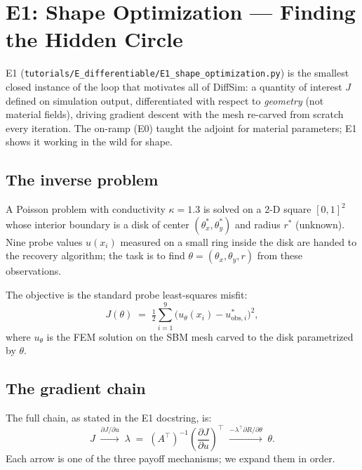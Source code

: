 \documentclass[11pt]{article}
\begin{document}
\section{E1: Shape Optimization --- Finding the Hidden Circle}
\label{sec:e1}

E1 (\texttt{tutorials/E\_differentiable/\allowbreak E1\_shape\_optimization.py})
is the smallest closed instance of the loop that motivates all of DiffSim:
a quantity of interest $J$ defined on simulation output, differentiated with
respect to \emph{geometry} (not material fields), driving gradient descent
with the mesh re-carved from scratch every iteration.  The on-ramp (E0)
taught the adjoint for material parameters; E1 shows it working in the wild
for shape.

\subsection{The inverse problem}
\label{sec:e1problem}

A Poisson problem with conductivity $\kappa = 1.3$ is solved on a 2-D
square $[0,1]^2$ whose interior boundary is a disk of center
$(\theta_x^*, \theta_y^*)$ and radius $r^*$ (unknown).  Nine probe
values $u(x_i)$ measured on a small ring inside the disk are handed to the
recovery algorithm; the task is to find $\theta = (\theta_x, \theta_y, r)$
from these observations.

The objective is the standard probe least-squares misfit:
\begin{equation}
  J(\theta) \;=\; \tfrac{1}{2}
  \sum_{i=1}^{9} \bigl(u_\theta(x_i) - u^*_{\mathrm{obs},i}\bigr)^2,
  \label{eq:e1J}
\end{equation}
where $u_\theta$ is the FEM solution on the SBM mesh carved to the disk
parametrized by $\theta$.

\subsection{The gradient chain}
\label{sec:e1chain}

The full chain, as stated in the E1 docstring, is:
\begin{equation}
  J
  \;\xrightarrow{\partial J/\partial u}\;
  \lambda \;=\; (A^\top)^{-1}\!\left(\frac{\partial J}{\partial u}\right)^\top
  \;\xrightarrow{-\lambda^\top \partial R/\partial \theta}\;
  \theta .
  \label{eq:e1chain}
\end{equation}
Each arrow is one of the three payoff mechanisms; we expand them in order.
\end{document}
